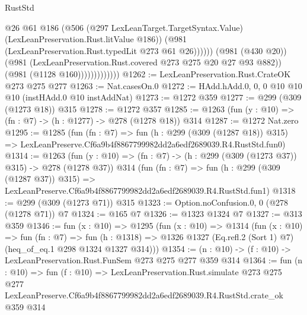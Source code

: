 \begin{lexlean}{RustStd}
\begin{coremodule}
                                  @26
                                  @61
                                  @186
                                  (@506
                                    (@297 LexLeanTarget.TargetSyntax.Value)
                                    (LexLeanPreservation.Rust.litValue @186))
                                  (@981 (LexLeanPreservation.Rust.typedLit @273 @61 @26))))))
                          (@981 (@430 @20))
                          (@981 (LexLeanPreservation.Rust.covered @273 @275 @20 @27 @93 @882))
                          (@981 (@1128 @160)))))))))))))
@1262 := LexLeanPreservation.Rust.CrateOK @273 @275 @277
@1263 := Nat.casesOn.{0}
@1272 := HAdd.hAdd.{0, 0, 0} @10 @10 @10 (instHAdd.{0} @10 instAddNat)
@1273 := @1272 @359
@1277 := @299 (@309 (@1273 @18)) @315
@1278 := @1272 @357
@1285 := @1263 (fun (y : @10) => (fn : @7) -> (h : @1277) -> @278 (@1278 @18)) @314
@1287 := @1272 Nat.zero
@1295 := @1285
    (fun (fn : @7) =>
    fun (h : @299 (@309 (@1287 @18)) @315) =>
    LexLeanPreserve.Cf6a9b4f8867799982dd2a6edf2689039.R4.RustStd.fun0)
@1314 := @1263
    (fun (y : @10) => (fn : @7) -> (h : @299 (@309 (@1273 @37)) @315) -> @278 (@1278 @37))
    @314
    (fun (fn : @7) =>
    fun (h : @299 (@309 (@1287 @37)) @315) =>
    LexLeanPreserve.Cf6a9b4f8867799982dd2a6edf2689039.R4.RustStd.fun1)
@1318 := @299 (@309 (@1273 @71)) @315
@1323 := Option.noConfusion.{0, 0} (@278 (@1278 @71)) @7
@1324 := @165 @7
@1326 := @1323 @1324 @7
@1327 := @313 @359
@1346 := fun (x : @10) =>
  @1295
    (fun (x : @10) =>
    @1314
      (fun (x : @10) =>
      fun (fn : @7) =>
      fun (h : @1318) =>
      @1326 @1327 (Eq.refl.{2} (Sort 1) @7) (heq_of_eq.{1} @298 @1324 @1327 @314)))
@1354 := (n : @10) -> (f : @10) -> LexLeanPreservation.Rust.FunSem @273 @275 @277 @359 @314
@1364 := fun (n : @10) =>
  fun (f : @10) =>
  LexLeanPreservation.Rust.simulate
    @273
    @275
    @277
    LexLeanPreserve.Cf6a9b4f8867799982dd2a6edf2689039.R4.RustStd.crate_ok
    @359
    @314
\end{coremodule}
\end{lexlean}
